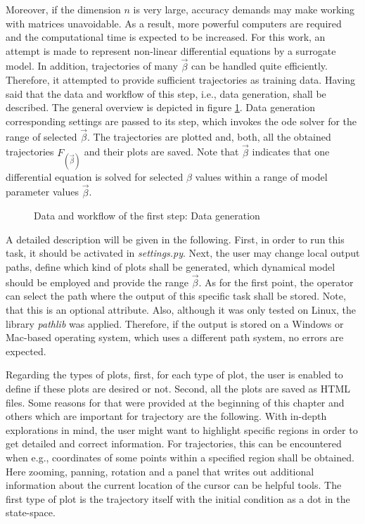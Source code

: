 Moreover, if the dimension $n$ is very large, accuracy demands may make working with matrices unavoidable. 
As a result, more powerful computers are required and the computational time is expected to be increased.
For this work, an attempt is made to represent non-linear differential equations by a surrogate model. 
In addition, trajectories of many $\vec{\beta }$ can be handled quite efficiently. 
Therefore, it attempted to provide sufficient trajectories as training data.
Having said that the data and workflow of this step, i.e., data generation, shall be described. 
The general overview is depicted in figure \ref{fig_4_Data_Gen}. 
Data generation corresponding settings are passed to its step, which invokes the \gls{ode} solver for the range of selected $\vec{\beta}$. 
The trajectories are plotted and, both, all the obtained trajectories $F_(\vec{\beta})$ and their plots are saved. Note that $\vec{\beta}$ indicates that one differential equation is solved for selected $\beta$ values within a range of model parameter values $\vec{\beta}$.\newline 
%
\begin{figure} [!h]
    \hspace*{-4cm} 
    \resizebox{1.2\textwidth}{!}{
    
    }
    \caption{Data and workflow of the first step: Data generation}
    \label{fig_4_Data_Gen}
\end{figure}
%
%
A detailed description will be given in the following. 
First, in order to run this task, it should be activated in \emph{settings.py}.
Next, the user may change local output paths, define which kind of plots shall be generated, which dynamical model should be employed and provide the range  $\vec{\beta}$.
As for the first point, the operator can select the path where the output of this specific task shall be stored. Note, that this is an optional attribute. Also, although it was only tested on Linux, the library \emph{pathlib} was applied.
Therefore, if the output is stored on a Windows or Mac-based operating system, which uses a different path system, no errors are expected.
\newline

Regarding the types of plots, first, for each type of plot, the user is enabled to define if these plots are desired or not. Second, all the plots are saved as HTML files. Some reasons for that were provided at the beginning of this chapter and others which are important for trajectory are the following. 
With in-depth explorations in mind, the user might want to highlight specific regions in order to get detailed and correct information. 
For trajectories, this can be encountered when e.g., coordinates of some points within a specified region shall be obtained. Here zooming, panning, rotation and a panel that writes out additional information about the current location of the cursor can be helpful tools. The first type of plot is the trajectory itself with the initial condition as a dot in the state-space.\newline 

